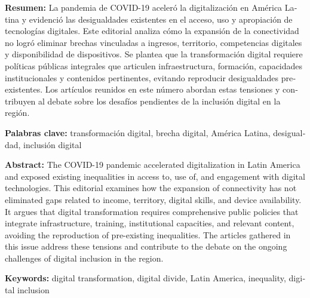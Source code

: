 \begin{tcolorbox}[colback=brown!8!white,colframe=brown!8!white,boxrule=0pt,arc=2pt,left=4pt,right=4pt,top=3pt,bottom=3pt,before skip=4pt,after skip=4pt]
\begin{otherlanguage}{spanish}
\sffamily\small \textbf{Resumen:} La pandemia de COVID-19 aceleró la digitalización en América Latina y evidenció las desigualdades existentes en el acceso, uso y apropiación de tecnologías digitales. Este editorial analiza cómo la expansión de la conectividad no logró eliminar brechas vinculadas a ingresos, territorio, competencias digitales y disponibilidad de dispositivos. Se plantea que la transformación digital requiere políticas públicas integrales que articulen infraestructura, formación, capacidades institucionales y contenidos pertinentes, evitando reproducir desigualdades preexistentes. Los artículos reunidos en este número abordan estas tensiones y contribuyen al debate sobre los desafíos pendientes de la inclusión digital en la región.
\par\smallskip\noindent\textbf{Palabras clave:} transformación digital, brecha digital, América Latina, desigualdad, inclusión digital
\end{otherlanguage}
\end{tcolorbox}

\begin{tcolorbox}[colback=brown!8!white,colframe=brown!8!white,boxrule=0pt,arc=2pt,left=4pt,right=4pt,top=3pt,bottom=3pt,before skip=4pt,after skip=4pt]
\begin{otherlanguage}{english}
\sffamily\small \textbf{Abstract:} The COVID-19 pandemic accelerated digitalization in Latin America and exposed existing inequalities in access to, use of, and engagement with digital technologies. This editorial examines how the expansion of connectivity has not eliminated gaps related to income, territory, digital skills, and device availability. It argues that digital transformation requires comprehensive public policies that integrate infrastructure, training, institutional capacities, and relevant content, avoiding the reproduction of pre-existing inequalities. The articles gathered in this issue address these tensions and contribute to the debate on the ongoing challenges of digital inclusion in the region.
\par\smallskip\noindent\textbf{Keywords:} digital transformation, digital divide, Latin America, inequality, digital inclusion
\end{otherlanguage}
\end{tcolorbox}


